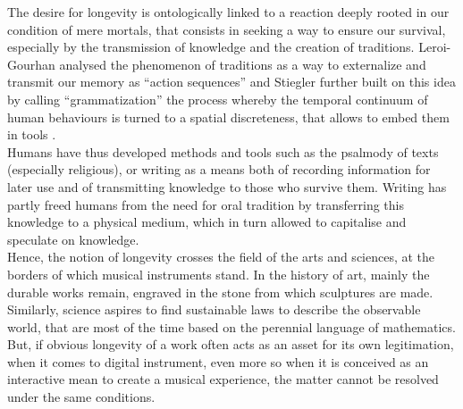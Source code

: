 The desire for longevity is ontologically linked to a reaction deeply rooted in our condition of mere mortals, that consists in seeking a way to ensure our survival, especially by the transmission of knowledge and the creation of traditions. Leroi-Gourhan analysed the phenomenon of traditions as a way to externalize and transmit our memory as “action sequences” \cite{gourhan_geste_1964} and Stiegler further built on this idea by calling “grammatization” the process whereby the temporal continuum of human behaviours is turned to a spatial discreteness, that allows to embed them in tools \cite{stiegler_for_2010}.\\
\indent Humans have thus developed methods and tools such as the psalmody of texts (especially religious), or writing as a means both of recording information for later use and of transmitting knowledge to those who survive them. Writing has partly freed humans from the need for oral tradition by transferring this knowledge to a physical medium, which in turn allowed to capitalise and speculate on knowledge.\\
\indent Hence, the notion of longevity crosses the field of the arts and sciences, at the borders of which musical instruments stand. In the history of art, mainly the durable works remain, engraved in the stone from which sculptures are made. Similarly, science aspires to find sustainable laws to describe the observable world, that are most of the time based on the perennial language of mathematics. But, if obvious longevity of a work often acts as an asset for its own legitimation, when it comes to digital instrument, even more so when it is conceived as an interactive mean to create a musical experience, the matter cannot be resolved under the same conditions.
	
